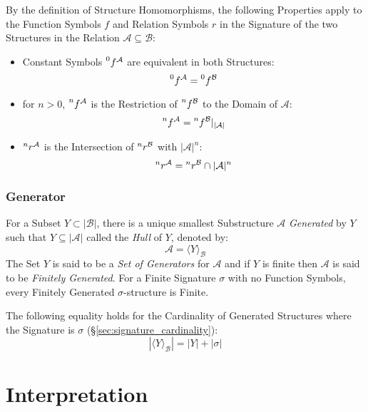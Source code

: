 By the definition of Structure Homomorphisms, the following Properties
apply to the Function Symbols $f$ and Relation Symbols $r$ in the
Signature of the two Structures in the Relation $\mathcal{A} \subseteq
\mathcal{B}$:
\begin{itemize}
    \item Constant Symbols $\prescript{0}{}{f}^\mathcal{A}$ are
      equivalent in both Structures:
\[
    \prescript{0}{}{f}^\mathcal{A} = \prescript{0}{}{f}^\mathcal{B}
\]
    \item for $n >0$, $\prescript{n}{}{f}^\mathcal{A}$ is the
      Restriction of $\prescript{n}{}{f}^\mathcal{B}$ to the Domain of
      $\mathcal{A}$:
\[
    \prescript{n}{}{f}^\mathcal{A}
    = \prescript{n}{}{f}^\mathcal{B} |_{|\mathcal{A}|}
\]
    \item $\prescript{n}{}{r}^\mathcal{A}$ is the Intersection of
      $\prescript{n}{}{r}^\mathcal{B}$ with $|\mathcal{A}|^n$:
\[
    \prescript{n}{}{r}^\mathcal{A}
    = \prescript{n}{}{r}^\mathcal{B} \cap |\mathcal{A}|^n
\]
\end{itemize}



\subsubsection{Generator} \label{sec:generator}

For a Subset $Y \subset |\mathcal{B}|$, there is a unique smallest
Substructure $\mathcal{A}$ \emph{Generated} by $Y$ such that $Y
\subseteq |\mathcal{A}|$ called the \emph{Hull} of $Y$, denoted by:
\[
    \mathcal{A} = \langle Y \rangle_\mathcal{B}
\]
The Set $Y$ is said to be a \emph{Set of Generators} for $\mathcal{A}$
and if $Y$ is finite then $\mathcal{A}$ is said to be \emph{Finitely
  Generated}. For a Finite Signature $\sigma$ with no Function
Symbols, every Finitely Generated $\sigma$-structure is Finite.

The following equality holds for the Cardinality of Generated
Structures where the Signature is $\sigma$
(\S\ref{sec:signature_cardinality}):
\[
  |\langle Y \rangle_\mathcal{B}| = |Y| + |\sigma|
\]



\section{Interpretation}\label{sec:interpretation}

